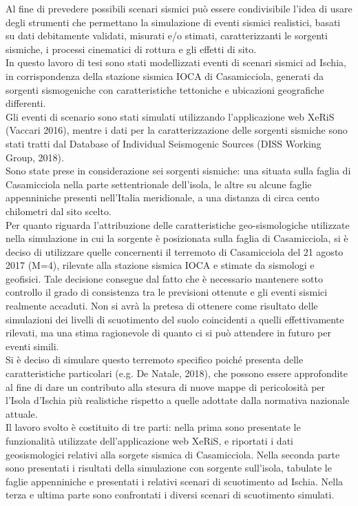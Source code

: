 \documentclass[a4paper,12pt,titlepage]{article}
\begin{document}
Al fine di prevedere possibili scenari sismici può essere condivisibile l'idea di usare degli strumenti che permettano la simulazione di eventi sismici
realistici, basati su dati debitamente validati, misurati e/o stimati, caratterizzanti le sorgenti sismiche, i processi cinematici di rottura e gli effetti di sito.\\

In questo lavoro di tesi sono stati modellizzati eventi di scenari sismici ad Ischia, in corrispondenza della stazione sismica IOCA di Casamicciola, generati da sorgenti sismogeniche con caratteristiche tettoniche e ubicazioni geografiche differenti.\\
Gli eventi di scenario sono stati simulati utilizzando l'applicazione web XeRiS (Vaccari 2016), mentre i dati per la caratterizzazione delle sorgenti sismiche
sono stati tratti dal Database of Individual Seismogenic Sources (DISS Working Group, 2018).\\
Sono state prese in considerazione sei sorgenti sismiche: una situata sulla faglia di Casamicciola nella parte settentrionale dell'isola, le altre su alcune faglie appenniniche presenti nell'Italia meridionale, a una distanza di circa cento chilometri dal sito scelto.\\
Per quanto riguarda l'attribuzione delle caratteristiche geo-sismologiche utilizzate nella simulazione in cui la sorgente è posizionata sulla faglia di
Casamicciola, si è deciso di utilizzare quelle concernenti il terremoto di Casamicciola del 21 agosto 2017 (M=4), rilevate alla stazione sismica IOCA e
stimate da sismologi e geofisici. Tale decisione consegue dal fatto che è necessario mantenere sotto controllo il grado di consistenza tra le previsioni
ottenute e gli eventi sismici realmente accaduti. Non si avrà la pretesa di ottenere come risultato delle simulazioni dei livelli di scuotimento del suolo coincidenti a quelli effettivamente rilevati, ma una stima ragionevole di quanto ci si può attendere in futuro per eventi simili.\\
Si è deciso di simulare questo terremoto specifico poiché presenta delle caratteristiche particolari (e.g. De Natale, 2018), che possono essere approfondite al fine di dare un contributo alla stesura di nuove mappe di pericolosità per l'Isola d'Ischia più realistiche rispetto a quelle adottate dalla normativa nazionale attuale.\\
Il lavoro svolto è costituito di tre parti: nella prima sono presentate le funzionalità utilizzate dell'applicazione web XeRiS, e riportati i dati geosismologici relativi alla sorgete sismica di Casamicciola. Nella seconda parte sono presentati i risultati della simulazione con sorgente sull'isola, tabulate le faglie appenniniche e presentati i relativi scenari di scuotimento ad Ischia. Nella terza e ultima parte sono confrontati i diversi scenari di scuotimento simulati.
\end{document}
